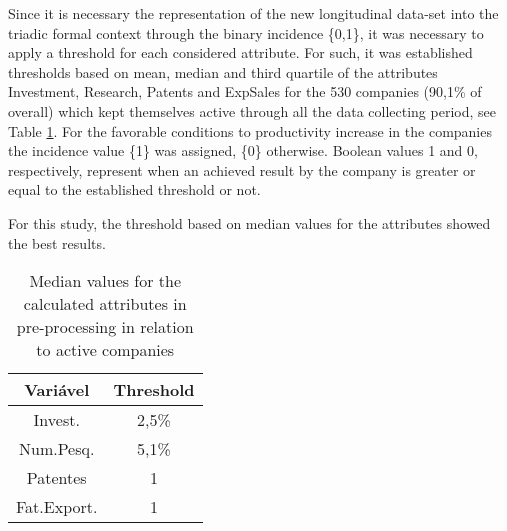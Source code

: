 \documentclass[a4paper,twoside]{article}
\begin{document}
Since it is necessary the representation of the new longitudinal data-set into the triadic formal context through the binary incidence \{0,1\}, it was necessary to apply a threshold for each considered attribute. For such, it was established thresholds based on mean, median and third quartile of the attributes Investment, Research, Patents and ExpSales for the 530 companies (90,1\% of overall) which kept themselves active through all the data collecting period, see Table \ref{tabela:1}. For the favorable conditions to productivity increase in the companies the incidence value \{1\} was assigned, \{0\} otherwise. Boolean values 1 and 0, respectively, represent when an achieved result by the company is greater or equal to the established threshold or not.

For this study, the threshold based on median values for the attributes showed the best results.

\begin{table}[ht!]
    \centering
    \begin{tabular}{||c c||} 
         \hline
         Variável & Threshold \\ [0.5ex] 
         \hline\hline
         Invest. & 2,5\% \\
         Num.Pesq. & 5,1\% \\
         Patentes & 1 \\
         Fat.Export. & 1 \\ [1ex] 
         \hline
    \end{tabular}
    \caption{Median values for the calculated attributes in pre-processing in relation to active companies}
    \label{tabela:1}
\end{table}
\end{document}
